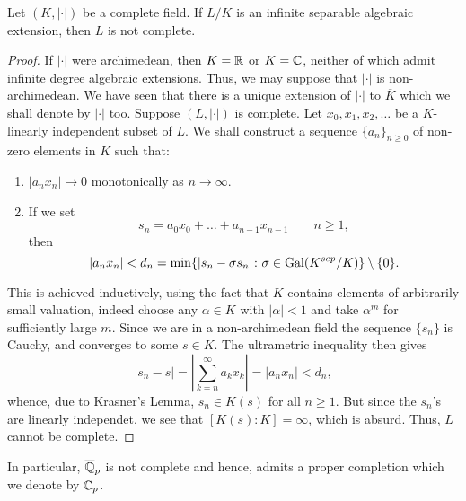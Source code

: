 \begin{theorem}
    Let $(K, |\cdot|)$ be a complete field. If $L/K$ is an infinite separable algebraic extension, then $L$ is not complete.
\end{theorem}
\begin{proof}
    If $|\cdot|$ were archimedean, then $K = \mathbb{R}$ or $K = \mathbb{C}$, neither of which admit infinite degree algebraic extensions. Thus, we may suppose that $|\cdot|$ is non-archimedean. We have seen that there is a unique extension of $|\cdot|$ to $\overline K$ which we shall denote by $|\cdot|$ too. Suppose $(L, |\cdot|)$ is complete. Let $x_0, x_1, x_2,\dots$ be a $K$-linearly independent subset of $L$. We shall construct a sequence $\{a_{n}\}_{n\ge 0}$ of non-zero elements in $K$ such that: 
    \begin{enumerate}[label=(\arabic*)]
        \item $|a_nx_n|\to 0$ monotonically as $n\to\infty$.
        \item If we set 
        \begin{equation*}
            s_n = a_0x_0 + \dots + a_{n - 1}x_{n - 1}\qquad n\ge 1,
        \end{equation*}
        then 
        \begin{equation*}
            |a_nx_n| < d_n = \min\{|s_n - \sigma s_n|\colon\sigma\in\operatorname{Gal}(K^{sep}/K)\}\setminus\{0\}.
        \end{equation*}
    \end{enumerate}
    This is achieved inductively, using the fact that $K$ contains elements of arbitrarily small valuation, indeed choose any $\alpha\in K$ with $|\alpha| < 1$ and take $\alpha^m$ for sufficiently large $m$. Since we are in a non-archimedean field the sequence $\{s_n\}$ is Cauchy, and converges to some $s\in K$. The ultrametric inequality then gives 
    \begin{equation*}
        |s_n - s| = \left|\sum_{k = n}^\infty a_k x_k\right| = |a_nx_n| < d_n,
    \end{equation*}
    whence, due to Krasner's Lemma, $s_n\in K(s)$ for all $n\ge 1$. But since the $s_n$'s are linearly independet, we see that $[K(s) : K] = \infty$, which is absurd. Thus, $L$ cannot be complete.
\end{proof}

\begin{remark}
    In particular, $\overline{\mathbb{Q}}_p$ is not complete and hence, admits a proper completion which we denote by $\mathbb{C}_p$.
\end{remark}

